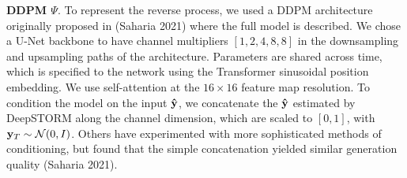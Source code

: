 \documentclass{article}
\begin{document}
\textbf{DDPM $\Psi$}. To represent the reverse process, we used a DDPM architecture originally proposed in (Saharia 2021) where the full model is described. We chose a U-Net backbone to have channel multipliers $[1,2,4,8,8]$ in the downsampling and upsampling paths of the architecture. Parameters are shared across time, which is specified to the network using the Transformer sinusoidal position embedding. We use self-attention at the $16 \times 16$ feature map resolution. To condition the model on the input $\bold{\hat{y}}$, we concatenate the $\bold{\hat{y}}$ estimated by DeepSTORM along the channel dimension, which are scaled to $[0,1]$, with $\bold{y}_T\sim \mathcal{N}(0, I)$. Others have experimented with more sophisticated methods of conditioning, but found that the simple concatenation yielded similar generation quality (Saharia 2021). 
\end{document}
